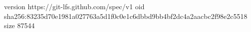 version https://git-lfs.github.com/spec/v1
oid sha256:83235d70e1981a027763a5d1f0c0e1c6dbbd9bb4bf2dc4a2aacbc2f98e2c5518
size 87544
